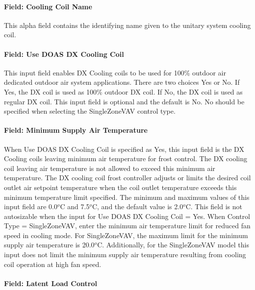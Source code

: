 \paragraph{Field: Cooling Coil Name}\label{field-cooling-coil-name-002}

This alpha field contains the identifying name given to the unitary system cooling coil.

\paragraph{Field: Use DOAS DX Cooling Coil}\label{field-use-doas-dx-cooling-coil}

This input field enables DX Cooling coils to be used for 100\% outdoor air dedicated outdoor air system applications. There are two choices Yes or No. If Yes, the DX coil is used as 100\% outdoor DX coil. If No, the DX coil is used as regular DX coil. This input field is optional and the default is No. No should be specified when selecting the SingleZoneVAV control type.

\paragraph{Field: Minimum Supply Air Temperature}\label{field-minimum-supply-air-temperature}

When Use DOAS DX Cooling Coil is specified as Yes, this input field is the DX Cooling coils leaving minimum air temperature for frost control. The DX cooling coil leaving air temperature is not allowed to exceed this minimum air temperature. The DX cooling coil frost controller adjusts or limits the desired coil outlet air setpoint temperature when the coil outlet temperature exceeds this minimum temperature limit specified. The minimum and maximum values of this input field are 0.0\(^{o}\)C and 7.5\(^{o}\)C, and the default value is 2.0\(^{o}\)C. This field is not autosizable when the input for Use DOAS DX Cooling Coil = Yes. When Control Type = SingleZoneVAV, enter the minimum air temperature limit for reduced fan speed in cooling mode. For SingleZoneVAV, the maximum limit for the minimum supply air temperature is 20.0\(^{o}\)C. Additionally, for the SingleZoneVAV model this input does not limit the minimum supply air temperature resulting from cooling coil operation at high fan speed.


\paragraph{Field: Latent Load Control}\label{field-latent-load-control}

